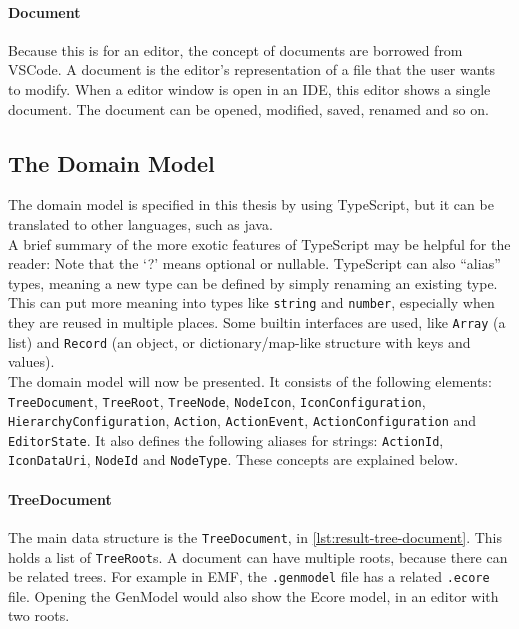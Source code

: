 \paragraph{Document}
Because this is for an editor, the concept of documents are borrowed from \gls{VSCode}.
A document is the editor's representation of a file that the user wants to modify.
When a editor window is open in an \acrshort{IDE}, this editor shows a single document.
The document can be opened, modified, saved, renamed and so on.


\subsection{The Domain Model}

The domain model is specified in this thesis by using \gls{TypeScript}, but it can be translated to other languages, such as java.\\

A brief summary of the more exotic features of \gls{TypeScript} may be helpful for the reader:
Note that the `?' means optional or nullable.
\gls{TypeScript} can also ``alias'' types, meaning a new type can be defined by simply renaming an existing type.
This can put more meaning into types like \texttt{string} and \texttt{number}, especially when they are reused in multiple places.
Some builtin interfaces are used, like \texttt{Array} (a list) and \texttt{Record} (an object, or dictionary/map-like structure with keys and values).\\

The domain model will now be presented.
It consists of the following elements: \texttt{TreeDocument}, \texttt{TreeRoot}, \texttt{TreeNode}, \texttt{NodeIcon}, \texttt{IconConfiguration}, \texttt{HierarchyConfiguration}, \texttt{Action}, \texttt{ActionEvent}, \texttt{ActionConfiguration} and \texttt{EditorState}.
It also defines the following aliases for strings: \texttt{ActionId}, \texttt{IconDataUri}, \texttt{NodeId} and \texttt{NodeType}.
These concepts are explained below.

\paragraph{TreeDocument}
The main data structure is the \texttt{TreeDocument}, in \cref{lst:result-tree-document}.
This holds a list of \texttt{TreeRoot}s.
A document can have multiple roots, because there can be related trees.
For example in \acrshort{EMF}, the \texttt{.genmodel} file has a related \texttt{.ecore} file.
Opening the GenModel would also show the \gls{Ecore} model, in an editor with two roots.

